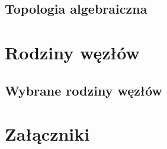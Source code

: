 \documentclass{LegrandOrangeBook}
\begin{document}
\chapter{Topologia algebraiczna}






\part{Rodziny węzłów}
\chapter{Wybrane rodziny węzłów}










\part{Załączniki}
\chapterspaceabove{5.75cm} %
\chapterspacebelow{7.25cm} %
\end{document}
